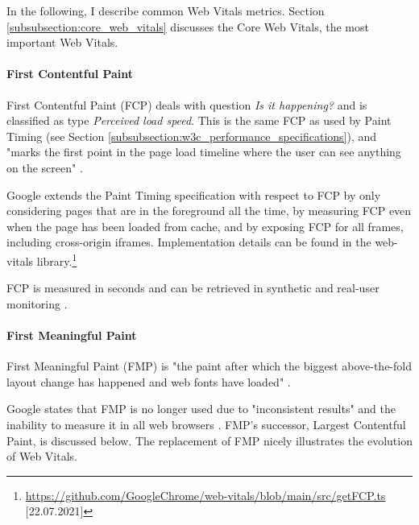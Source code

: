 
In the following, I describe common Web Vitals metrics.
Section \ref{subsubsection:core_web_vitals} discusses the Core Web Vitals, the most important Web Vitals.


\paragraph{First Contentful Paint} %

First Contentful Paint (FCP) deals with question \textit{Is it happening?} and is classified as type \textit{Perceived load speed}.
This is the same FCP as used by Paint Timing (see Section \ref{subsubsection:w3c_performance_specifications}), and "marks the first point in the page load timeline where the user can see anything on the screen" \cite{2019WaltonFCP}.

Google extends the Paint Timing specification with respect to FCP by only considering pages that are in the foreground all the time, by measuring FCP even when the page has been loaded from cache, and by exposing FCP for all frames, including cross-origin iframes.
Implementation details can be found in the web-vitals library.\footnote{\url{https://github.com/GoogleChrome/web-vitals/blob/main/src/getFCP.ts} [22.07.2021]}

FCP is measured in seconds and can be retrieved in synthetic and real-user monitoring \cite{2019WaltonFCP}.


\paragraph{First Meaningful Paint} %

First Meaningful Paint (FMP) is "the paint after which the biggest above-the-fold layout change has happened and web fonts have loaded" \cite{2021MDNFMP}.

Google states that FMP is no longer used due to "inconsistent results" and the inability to measure it in all web browsers \cite{2019GoogleFMP}.
FMP's successor, Largest Contentful Paint, is discussed below.
The replacement of FMP nicely illustrates the evolution of Web Vitals.



